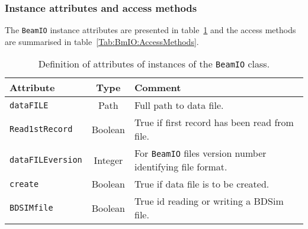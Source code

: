 \subsubsection{Instance attributes and access methods}
\label{Para:BmIO:InstAttr}
\noindent
The \texttt{BeamIO} instance attributes are presented in
table~\ref{Tab:BmIO:Attributes} and the access methods are summarised
in table~\ref{Tab:BmIO:AccessMethods}.
\begin{table}[h]
  \caption{
    Definition of attributes of instances of the \texttt{BeamIO} class.
  }
  \label{Tab:BmIO:Attributes}
  \begin{center}
    \begin{tabular}{|l|c|p{11cm}|}
      \hline
      \textbf{Attribute} & \textbf{Type} & \textbf{Comment}                \\
      \hline
      \texttt{dataFILE}        & Path    & Full path to data file.                  \\
      \texttt{Read1stRecord}   & Boolean & True if first record has been read from file. \\
      \texttt{dataFILEversion} & Integer & For \texttt{BeamIO} files version number identifying file format. \\
      \texttt{create}          & Boolean & True if data file is to be created. \\
      \texttt{BDSIMfile}       & Boolean & True id reading or writing a BDSim file. \\
       \hline
    \end{tabular}
  \end{center}
\end{table}
